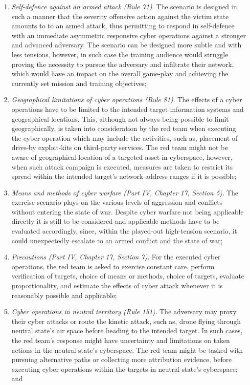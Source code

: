 \begin{enumerate}
    \item \textit{Self-defence against an armed attack (Rule 71)}. The scenario is designed in such a manner that the severity offensive action against the victim state amounts to to an armed attack, thus permitting to respond in self-defence with an immediate asymmetric responsive cyber operations against a stronger and advanced adversary. The scenario can be designed more subtle and with less tensions, however, in such case the training audience would struggle proving the necessity to pursue the adversary and infiltrate their network, which would have an impact on the overall game-play and achieving the currently set mission and training objectives;
    \item \textit{Geographical limitations of cyber operations (Rule 81)}. The effects of a cyber operations have to be limited to the intended target information systems and geographical locations. This, although not always being possible to limit geographically, is taken into consideration by the red team when executing the cyber operation which may include the activities, such as, placement of drive-by exploit-kits on third-party services. The red team might not be aware of geographical location of a targeted asset in cyberspace, however, when such attack campaign is executed, measures are taken to restrict its spread within the intended target's network address ranges if it is possible;
    \item \textit{Means and methods of cyber warfare (Part IV, Chapter 17, Section 5)}. The exercise scenario plays on the various levels of aggression and conflicts without entering the state of war. Despite cyber warfare not being applicable directly it is still to be considered and applicable methods have to be evaluated accordingly, since, within the played-out high-tension scenario, it could unexpectedly escalate to an armed conflict and the state of war;
    \item \textit{Precautions (Part IV, Chapter 17, Section 7)}. For the executed cyber operations, the red team is asked to exercise constant care, perform verification of targets, choice of means or methods, choice of targets, evaluate proportionality, and estimate the effects of cyber attack whenever it is reasonably possible and applicable;
    \item \textit{Cyber operations in neutral territory (Rule 151)}. The adversary may proxy their cyber attacks or route the kinetic attack, such as, drone flying through neutral state's air space before heading to the intended target. In such cases, the red team's response might have uncertainty and limitations on taken actions in the neutral state's cyberspace. The red team might be tasked with pursuing alternative paths or collecting more attribution evidence, before executing cyber operations within the targets in neutral state's cyberspace; and

\end{enumerate}
